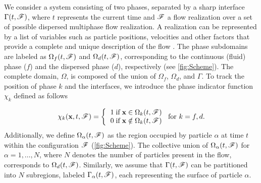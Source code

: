 We consider a system consisting of two phases, separated by a sharp interface $\Gamma(t,\mathscr{F})$,
where $t$ represents the current time and $\mathscr{F}$ a flow realization over a set of possible dispersed multiphase flow realization.  
A realization can be represented by a list of variables such as particle positions, velocities and other factors that provide a complete and unique description of the flow \citep{zhang2021ensemble}. %
The phase subdomains are labeled as $\Omega_f(t,\mathscr{F})$ and $\Omega_d(t,\mathscr{F})$, corresponding to the continuous (fluid) phase ($f$) and the dispersed phase ($d$), respectively (see \ref{fig:Scheme}). 
The complete domain, $\Omega$, is composed of the union of $\Omega_f$, $\Omega_d$, and $\Gamma$. To track the position of phase $k$ and the interfaces, we introduce the phase indicator function $\chi_k$ defined as follows

\begin{align}
    \chi_k(\textbf{x},t,\FF) =  \left\{
      \begin{tabular}{cc}
        $1 \;\text{if} \;\textbf{x} \in \Omega_k(t,\FF)$\\
        $0 \;\text{if} \;\textbf{x} \notin \Omega_k(t,\FF)$
      \end{tabular}
      \right.
      \text{for $k = f,d$}.
      \label{eq:PIF}
\end{align}
Additionally, we define $\Omega_\alpha(t, \mathscr{F})$ as the region occupied by particle $\alpha$ at time $t$ within the configuration $\mathscr{F}$ (\ref{fig:Scheme}). The collective union of $\Omega_\alpha(t, \mathscr{F})$ for $\alpha = 1, \ldots, N$, where $N$ denotes the number of particles present in the flow, corresponds to $\Omega_d(t, \mathscr{F})$. Similarly, we assume that $\Gamma(t, \mathscr{F})$ can be partitioned into $N$ subregions, labeled $\Gamma_\alpha(t, \mathscr{F})$, each representing the surface of particle $\alpha$.

